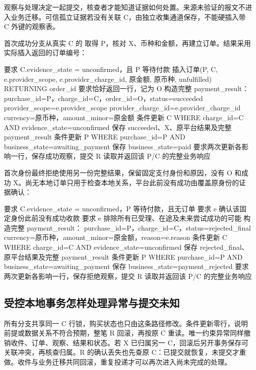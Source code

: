 观察与处理决定一起提交，核查者才能知道证据如何处置。来源未验证的报文不进入业务迁移。可信孤立证据若没有关联 C，由独立收集通道保存，不能硬插入带 C 外键的观察表。

首次成功分支从真实 C 的  取得 P，核对 X、币种和金额，再建立订单。结果采用实际插入返回的订单编号：

\begin{BookCode}
要求 C.evidence_state = unconfirmed，且 P 等待付款
插入订单(P, C, e.provider_scope, e.provider_charge_id,
         原金额, 原币种, unfulfilled)
    RETURNING order_id
要求恰好返回一行，记为 O
构造完整 payment_result：
    purchase_id=P，charge_id=C，order_id=O，status=succeeded
    provider_scope=e.provider_scope
    provider_charge_id=e.provider_charge_id
    currency=原币种，amount_minor=原金额
条件更新 C WHERE charge_id=C AND evidence_state=unconfirmed
    保存 succeeded、X、原平台结果及完整 payment_result
条件更新 P WHERE purchase_id=P AND business_state=awaiting_payment
    保存 business_state=paid
要求两次更新各影响一行，保存成功观察，提交 R
读取并返回该 P/C 的完整业务响应
\end{BookCode}

首次身份最终拒绝使用另一份完整结果，保留固定支付身份和原因，没有 O 和成功 X。尚无本地订单只用于检查本地关系，平台此前没有成功由覆盖原身份的证据确认：

\begin{BookCode}
要求 C.evidence_state = unconfirmed，P 等待付款，且无订单
要求 e 确认该固定身份此前没有成功收款
要求 e 排除所有已受理、在途及未来尝试成功的可能
构造完整 payment_result：
    purchase_id=P，charge_id=C，status=rejected_final
    currency=原币种，amount_minor=原金额，reason=e.reason
条件更新 C WHERE charge_id=C AND evidence_state=unconfirmed
    保存 rejected_final、原平台结果及完整 payment_result
条件更新 P WHERE purchase_id=P AND business_state=awaiting_payment
    保存 business_state=payment_rejected
要求两次更新各影响一行，保存拒绝观察，提交 R
读取并返回该 P/C 的完整业务响应
\end{BookCode}

\subsection*{受控本地事务怎样处理异常与提交未知}

所有分支共享同一 C 行锁，购买状态也只由这条路径修改。条件更新零行，说明前提或数据关系不符合预期，整笔 R 回滚，再按原 C 重读。唯一约束异常同样撤销收件、订单、观察、结果和状态。若 X 已归属另一 C，回滚后另开事务保存可关联冲突，再核查归属。R 的确认丢失也先查原 C：已提交就恢复，未提交才重做。收件与业务迁移共同回滚，重复投递才可以再次进入尚未完成的处理。

